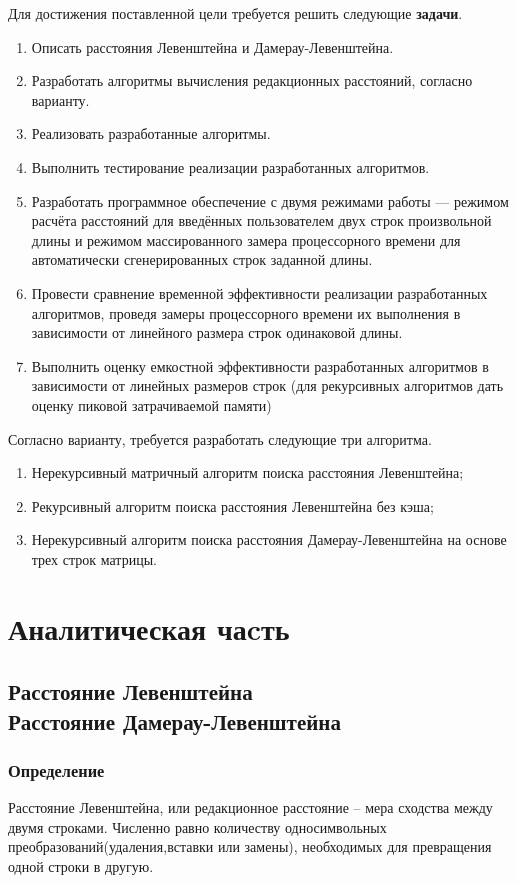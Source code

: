 \documentclass[12pt, a4paper]{article}
\begin{document}
Для достижения поставленной цели требуется решить следующие \textbf{задачи}.
\begin{enumerate}
	\item Описать расстояния Левенштейна и Дамерау-Левенштейна.
	\item Разработать алгоритмы вычисления редакционных расстояний, согласно варианту.
	\item Реализовать разработанные алгоритмы.
	\item Выполнить тестирование реализации разработанных алгоритмов.
	\item Разработать программное обеспечение с двумя режимами работы --- режимом расчёта расстояний для введённых пользователем двух строк произвольной длины и режимом массированного замера процессорного времени для автоматически сгенерированных строк заданной длины.
	\item Провести сравнение временной эффективности реализации разработанных алгоритмов, проведя замеры процессорного времени их выполнения в зависимости от линейного размера строк одинаковой длины.
	\item Выполнить оценку емкостной эффективности разработанных алгоритмов в зависимости от линейных размеров строк (для рекурсивных алгоритмов дать оценку пиковой затрачиваемой памяти)
\end{enumerate}
Согласно варианту, требуется разработать следующие три алгоритма.
\begin{enumerate}
\item Нерекурсивный матричный алгоритм поиска 
расстояния Левенштейна;
\item Рекурсивный алгоритм поиска расстояния
Левенштейна без кэша;
\item Нерекурсивный алгоритм поиска расстояния
 Дамерау-Левенштейна на основе трех строк 
 матрицы.
\end{enumerate}
\newpage
\section{Аналитическая чаcть}
\subsection{Расстояние Левенштейна\\
Расстояние  Дамерау-Левенштейна}
\subsubsection{Определение}
Расстояние Левенштейна, или редакционное расстояние 
-- мера сходства между двумя строками. Численно 
равно количеству односимвольных 
преобразований(удаления,вставки или замены), 
необходимых для превращения одной строки в другую.
\end{document}
